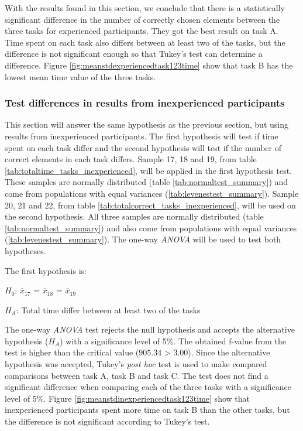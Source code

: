 \vspace{0.3cm}

With the results found in this section, we conclude that there is a statistically significant difference in the number of correctly chosen elements between the three tasks for experienced participants. They got the best result on task A. Time spent on each task also differs between at least two of the tasks, but the difference is not significant enough so that Tukey's test can determine a difference. Figure \ref{fig:meanstdexperiencedtask123time} show that task B has the lowest mean time value of the three tasks.  

\subsubsection[Sample 17 -  22]{Test differences in results from inexperienced participants}\label{sec:sample_17_18_19_anova}
This section will answer the same hypothesis as the previous section, but using results from inexperienced participants. The first hypothesis will test if time spent on each task differ and the second hypothesis will test if the number of correct elements in each task differs. Sample 17, 18 and 19, from table \ref{tab:totaltime_tasks_inexperienced}, will be applied in the first hypothesis test. These samples are normally distributed (table \ref{tab:normaltest_summary}) and come from populations with equal variances (\ref{tab:levenestest_summary}). Sample 20, 21 and 22, from table \ref{tab:totalcorrect_tasks_inexperienced}, will be used on the second hypothesis. All three samples are normally distributed (table \ref{tab:normaltest_summary}) and also come from populations with equal variances (\ref{tab:levenestest_summary}). The one-way \textit{ANOVA} will be used to test both hypotheses. 

The first hypothesis is:\\
\centerline{$H_{0}$: $\overline{x}_{17}$ = $\overline{x}_{18}$ = $\overline{x}_{19}$}
\centerline{$H_{A}$: Total time differ between at least two of the tasks}
\vspace{0.2cm}

The one-way \textit{ANOVA} test rejects the null hypothesis and accepts the alternative hypothesis ($H_{A}$) with a significance level of 5\%. The obtained f-value from the test is higher than the critical value ($905.34$ > $3.00$). Since the alternative hypothesis was accepted, Tukey's \textit{post hoc} test is used to make compared comparisons between task A, task B and task C. The test does not find a significant difference when comparing each of the three tasks with a significance level of 5\%. Figure \ref{fig:meanstdinexperiencedtask123time} show that inexperienced participants spent more time on task B than the other tasks, but the difference is not significant according to Tukey's test.

